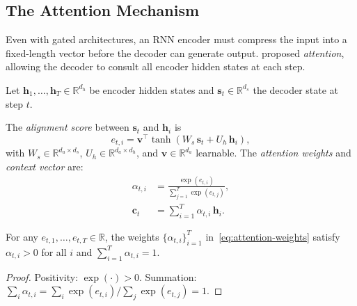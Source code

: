 \begin{deepdive}
\subsection{The Attention Mechanism}
\label{sec:sequential-attention}

Even with gated architectures, an RNN encoder must compress the input into a
fixed-length vector before the decoder can generate output.
\citet{bahdanau2015neural} %
proposed \emph{attention}, allowing the decoder to consult all encoder hidden states
at each step.

Let $\mathbf{h}_1, \ldots, \mathbf{h}_T \in \mathbb{R}^{d_h}$ be encoder hidden
states and $\mathbf{s}_t \in \mathbb{R}^{d_s}$ the decoder state at step $t$.

\begin{definition}
\label{def:bahdanau-attention}
The \emph{alignment score} between $\mathbf{s}_t$ and $\mathbf{h}_i$ is
\begin{equation}
  e_{t,i} = \mathbf{v}^{\top}
    \tanh\!\left(W_s\,\mathbf{s}_t + U_h\,\mathbf{h}_i\right),
  \label{eq:alignment-score}
\end{equation}
with $W_s \in \mathbb{R}^{d_a \times d_s}$, $U_h \in \mathbb{R}^{d_a \times d_h}$,
and $\mathbf{v} \in \mathbb{R}^{d_a}$ learnable.
The \emph{attention weights} and \emph{context vector} are:
\begin{align}
  \alpha_{t,i} &= \frac{\exp(e_{t,i})}{\sum_{j=1}^{T} \exp(e_{t,j})},
  \label{eq:attention-weights}\\
  \mathbf{c}_t &= \sum_{i=1}^{T} \alpha_{t,i}\,\mathbf{h}_i.
  \label{eq:context-vector}
\end{align}
\end{definition}

\begin{proposition}
\label{thm:attention-prob}
For any $e_{t,1},\ldots,e_{t,T} \in \mathbb{R}$, the weights
$\{\alpha_{t,i}\}_{i=1}^T$ in~\eqref{eq:attention-weights}
satisfy $\alpha_{t,i} > 0$ for all $i$ and $\sum_{i=1}^{T} \alpha_{t,i} = 1$.
\end{proposition}

\begin{proof}
Positivity: $\exp(\cdot) > 0$.
Summation: $\sum_i \alpha_{t,i} =
\sum_i \exp(e_{t,i}) / \sum_j \exp(e_{t,j}) = 1$. \qedhere
\end{proof}


\end{deepdive}
